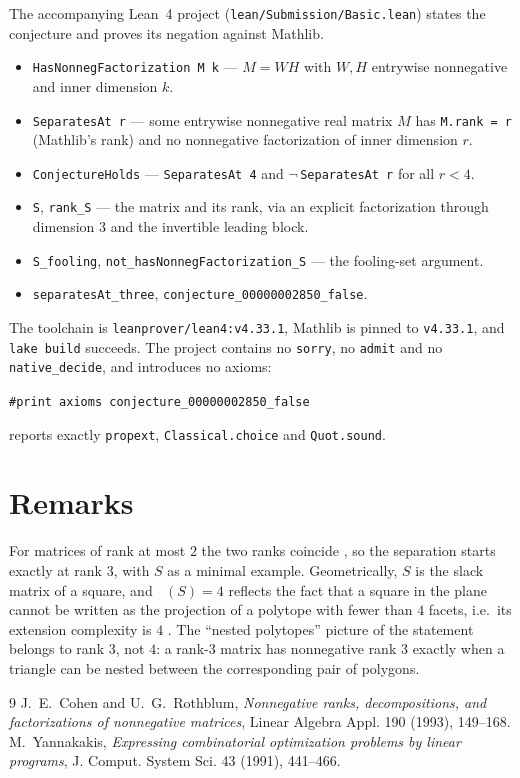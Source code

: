 \documentclass[11pt]{article}
\theoremstyle{plain}
\theoremstyle{definition}
\theoremstyle{remark}
\DeclareMathOperator{\rankp}{rank_+}
\begin{document}
The accompanying Lean~4 project (\texttt{lean/Submission/Basic.lean}) states
the conjecture and proves its negation against Mathlib.

\begin{itemize}
  \item \texttt{HasNonnegFactorization M k} --- $M=WH$ with $W,H$ entrywise
    nonnegative and inner dimension $k$.
  \item \texttt{SeparatesAt r} --- some entrywise nonnegative real matrix $M$
    has \texttt{M.rank = r} (Mathlib's rank) and no nonnegative factorization
    of inner dimension $r$.
  \item \texttt{ConjectureHolds} --- \texttt{SeparatesAt 4} and
    $\lnot\,$\texttt{SeparatesAt r} for all $r<4$.
  \item \texttt{S}, \texttt{rank\_S} --- the matrix and its rank, via an
    explicit factorization through dimension $3$ and the invertible leading
    block.
  \item \texttt{S\_fooling}, \texttt{not\_hasNonnegFactorization\_S} --- the
    fooling-set argument.
  \item \texttt{separatesAt\_three}, \texttt{conjecture\_00000002850\_false}.
\end{itemize}

The toolchain is \texttt{leanprover/lean4:v4.33.1}, Mathlib is pinned to
\texttt{v4.33.1}, and \texttt{lake build} succeeds. The project contains no
\texttt{sorry}, no \texttt{admit} and no \texttt{native\_decide}, and
introduces no axioms:
\begin{center}
\texttt{\#print axioms conjecture\_00000002850\_false}
\end{center}
reports exactly \texttt{propext}, \texttt{Classical.choice} and
\texttt{Quot.sound}.

\section{Remarks}

For matrices of rank at most $2$ the two ranks coincide \cite{cr}, so the
separation starts exactly at rank $3$, with $S$ as a minimal example. Geometrically,
$S$ is the slack matrix of a square, and $\rankp(S)=4$ reflects the fact that a
square in the plane cannot be written as the projection of a polytope with
fewer than $4$ facets, i.e.\ its extension complexity is $4$ \cite{yannakakis}.
The ``nested polytopes'' picture of the statement belongs to rank $3$, not $4$:
a rank-$3$ matrix has nonnegative rank $3$ exactly when a triangle can be
nested between the corresponding pair of polygons.

\begin{thebibliography}{9}
 J.~E.~Cohen and U.~G.~Rothblum, \emph{Nonnegative ranks,
  decompositions, and factorizations of nonnegative matrices}, Linear Algebra
  Appl. 190 (1993), 149--168.
 M.~Yannakakis, \emph{Expressing combinatorial
  optimization problems by linear programs}, J. Comput. System Sci. 43 (1991),
  441--466.
\end{thebibliography}
\end{document}
